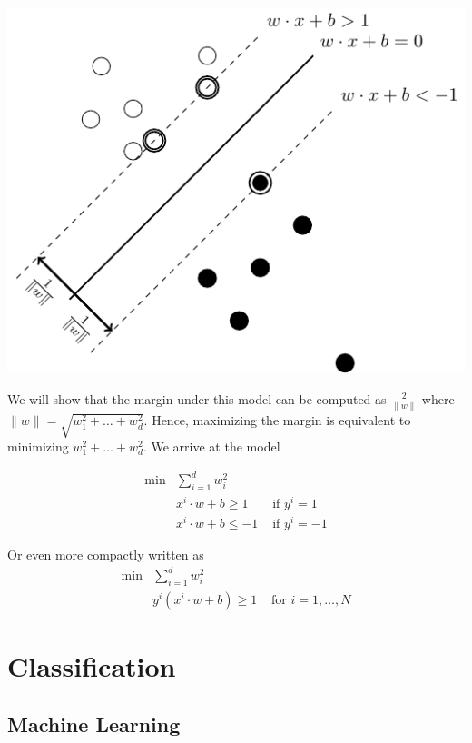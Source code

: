 \documentclass[../open-optimization/open-optimization.tex]{subfiles}
\begin{document}
\begin{center}
\includegraphics[scale = 0.75]{svm2}
\end{center}
We will show that the margin under this model can be computed as $\frac{2}{\|w\|}$ where $\|w\| = \sqrt{w_1^2 +  \dots + w_d^2}$.  Hence,  maximizing the margin is equivalent to minimizing $w_1^2 +  \dots + w_d^2$.  We arrive at the model

\begin{align}
\min & \sum_{i=1}^d w_i^2\\
&x^i \cdot w + b  \geq 1  & \text{ if } y^i = 1\\
&x^i \cdot w + b  \leq -1  & \text{ if } y^i = -1
\end{align}

Or even more compactly written as 
\begin{align}
\min & \sum_{i=1}^d w_i^2\\
&y^i(x^i \cdot w + b) \geq 1  & \text{ for } i=1, \dots, N
\end{align}






\section{Classification}



\subsection{Machine Learning}
\end{document}
